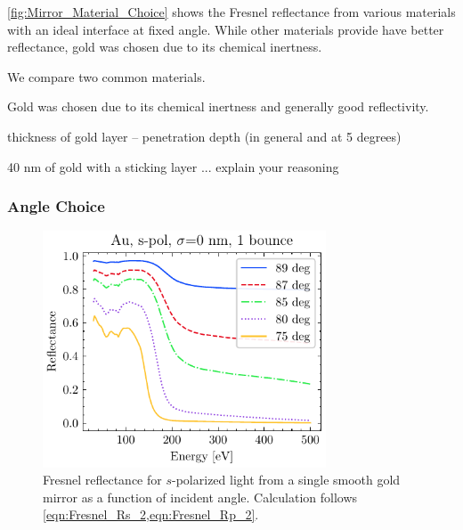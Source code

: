 \cref{fig:Mirror_Material_Choice} shows the Fresnel reflectance from various materials with an ideal interface at fixed angle. While other materials provide have better reflectance, gold was chosen due to its chemical inertness. 

We compare two common materials.

Gold was chosen due to its chemical inertness and generally good reflectivity.

thickness of gold layer -- penetration depth (in general and at 5 degrees)

40 nm of gold with a sticking layer ... explain your reasoning

\subsubsection{Angle Choice}
\begin{figure}
	\centering
	\includegraphics[width=0.75\textwidth]{figures/chap2/Au_ReflvsAngle.pdf}
	\caption{Fresnel reflectance for $s$-polarized light from a single smooth gold mirror as a function of incident angle. Calculation follows \cref{eqn:Fresnel_Rs_2,eqn:Fresnel_Rp_2}.}
	\label{fig:Au_ReflvsAngle}
\end{figure}

